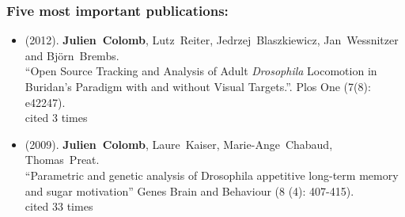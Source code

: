 \subsubsection{Five most important publications:}
\label{sec:FiveMostImportantPublications}

\begin{sloppypar}
\newcommand{\enquote}[1]{``#1''}
\providecommand{\bibinfo}[2]{#2}
%
%
%
%   
%   
%     
\begin{itemize}   
 
\item  (\bibinfo{year}{2012}).
  \bibinfo{author}{\textbf{Julien~Colomb}}, \bibinfo{author}{Lutz~Reiter},
  \bibinfo{author}{Jedrzej~Blaszkiewicz}, 
  \bibinfo{author}{Jan~Wessnitzer} and \bibinfo{author}{Bj\"{o}rn~Brembs}. \\
\newblock \enquote{\bibinfo{title}{Open Source Tracking and Analysis of Adult \textit{Drosophila} Locomotion in Buridan's Paradigm with and without Visual Targets.}}.
\newblock \bibinfo{journal}{Plos One}
  (\bibinfo{pages}{7(8): e42247}).
  \\cited 3 times%

\item   (\bibinfo{year}{2009}).  
 \bibinfo{author}{\textbf{Julien~Colomb}}, \bibinfo{author}{Laure~Kaiser}, \bibinfo{author}{Marie-Ange~Chabaud}, \bibinfo{author}{Thomas~Preat}.
\\
\newblock \enquote{\bibinfo{title}{Parametric and genetic analysis of Drosophila appetitive long-term memory and sugar motivation}}
\newblock \bibinfo{journal}{Genes Brain and Behaviour}
  (\bibinfo{pages}{8 (4): 407-415}).
   \\cited 33 times%
   


\end{itemize}
\end{sloppypar}
